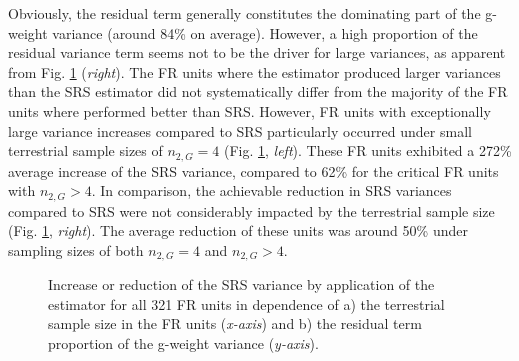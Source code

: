 Obviously, the residual term generally constitutes the dominating part of the \psmall{} g-weight variance (around 84\% on average). However, a high proportion of the residual variance term seems not to be the driver for large \psmall{} variances, as apparent from Fig. \ref{fig:fail} (\textit{right}). The FR units where the \psmall{} estimator produced larger variances than the SRS estimator did not systematically differ from the majority of the FR units where \psmall{} performed better than SRS. However, FR units with exceptionally large variance increases compared to SRS particularly occurred under small terrestrial sample sizes of $n_{2,G} = 4$ (Fig. \ref{fig:fail}, \textit{left}). These FR units exhibited a 272\% average increase of the SRS variance, compared to 62\% for the critical FR units with $n_{2,G} > 4$. In comparison, the achievable reduction in SRS variances compared to SRS were not considerably impacted by the terrestrial sample size (Fig. \ref{fig:fail}, \textit{right}). The average reduction of these units was around 50\% under sampling sizes of both $n_{2,G} = 4$ and $n_{2,G} > 4$. 

\begin{figure}[H]
	\centering
	\caption{Increase or reduction of the SRS variance by application of the \psmall{} estimator for all 321 FR units in dependence of a) the terrestrial sample size in the FR units (\textit{x-axis}) and b) the residual term proportion of the \psmall{} g-weight variance (\textit{y-axis}).}
	\label{fig:fail}
\end{figure}



